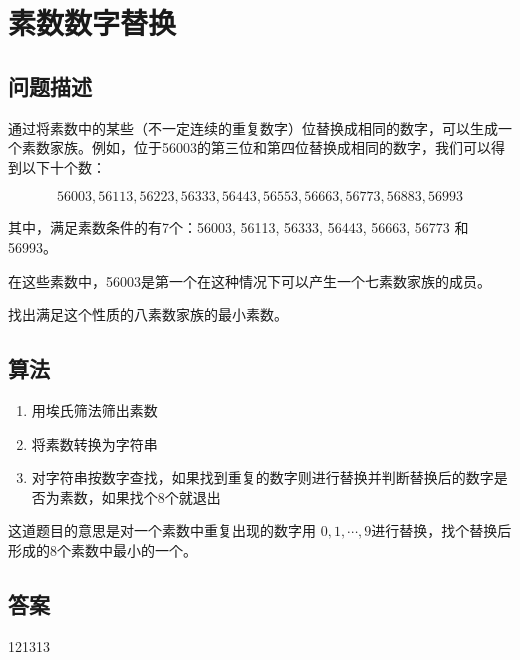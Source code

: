 \section{素数数字替换}
\subsection{问题描述}
\begin{tcolorbox}
	通过将素数中的某些（不一定连续的重复数字）位替换成相同的数字，可以生成一个素数家族。例如，位于56003的第三位和第四位替换成相同的数字，我们可以得到以下十个数：

	\[
		56003, 56113, 56223, 56333, 56443, 56553, 56663, 56773, 56883, 56993
	\]

	其中，满足素数条件的有7个：56003, 56113, 56333, 56443, 56663, 56773 和 56993。

	在这些素数中，56003是第一个在这种情况下可以产生一个七素数家族的成员。

	找出满足这个性质的八素数家族的最小素数。
\end{tcolorbox}

\subsection{算法}
\begin{enumerate}
	\item 用埃氏筛法筛出素数
	\item 将素数转换为字符串
	\item 对字符串按数字查找，如果找到重复的数字则进行替换并判断替换后的数字是否为素数，如果找个8个就退出
\end{enumerate}

这道题目的意思是对一个素数中重复出现的数字用 \( 0,1,\cdots, 9 \)进行替换，找个替换后形成的8个素数中最小的一个。

\subsection{答案}
121313
